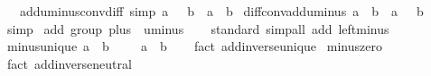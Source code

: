 \begin{isabellebody}
\ \ \ add{\isacharunderscore}{\kern0pt}uminus{\isacharunderscore}{\kern0pt}conv{\isacharunderscore}{\kern0pt}diff\ {\isacharbrackleft}{\kern0pt}simp{\isacharbrackright}{\kern0pt}{\isacharcolon}{\kern0pt}\ {\isachardoublequoteopen}a\ {\isacharplus}{\kern0pt}\ {\isacharparenleft}{\kern0pt}{\isacharminus}{\kern0pt}\ b{\isacharparenright}{\kern0pt}\ {\isacharequal}{\kern0pt}\ a\ {\isacharminus}{\kern0pt}\ b{\isachardoublequoteclose}\isanewline
{}\isanewline
\isanewline
{}\isamarkupfalse%
\ diff{\isacharunderscore}{\kern0pt}conv{\isacharunderscore}{\kern0pt}add{\isacharunderscore}{\kern0pt}uminus{\isacharcolon}{\kern0pt}\ {\isachardoublequoteopen}a\ {\isacharminus}{\kern0pt}\ b\ {\isacharequal}{\kern0pt}\ a\ {\isacharplus}{\kern0pt}\ {\isacharparenleft}{\kern0pt}{\isacharminus}{\kern0pt}\ b{\isacharparenright}{\kern0pt}{\isachardoublequoteclose}\isanewline
%
\isadelimproof
\ \ %
\endisadelimproof
%
\isatagproof
{}\isamarkupfalse%
\ simp%
\endisatagproof
{\isafoldproof}%
%
\isadelimproof
\isanewline
%
\endisadelimproof
\isanewline
{}\isamarkupfalse%
\ add{\isacharcolon}{\kern0pt}\ group\ plus\ {}\ uminus\isanewline
%
\isadelimproof
\ \ %
\endisadelimproof
%
\isatagproof
{}\isamarkupfalse%
\ standard\ {\isacharparenleft}{\kern0pt}simp{\isacharunderscore}{\kern0pt}all\ add{\isacharcolon}{\kern0pt}\ left{\isacharunderscore}{\kern0pt}minus{\isacharparenright}{\kern0pt}%
\endisatagproof
{\isafoldproof}%
%
\isadelimproof
\isanewline
%
\endisadelimproof
\isanewline
{}\isamarkupfalse%
\ minus{\isacharunderscore}{\kern0pt}unique{\isacharcolon}{\kern0pt}\ {\isachardoublequoteopen}a\ {\isacharplus}{\kern0pt}\ b\ {\isacharequal}{\kern0pt}\ {}\ {\isasymLongrightarrow}\ {\isacharminus}{\kern0pt}\ a\ {\isacharequal}{\kern0pt}\ b{\isachardoublequoteclose}\isanewline
%
\isadelimproof
\ \ %
\endisadelimproof
%
\isatagproof
{}\isamarkupfalse%
\ {\isacharparenleft}{\kern0pt}fact\ add{\isachardot}{\kern0pt}inverse{\isacharunderscore}{\kern0pt}unique{\isacharparenright}{\kern0pt}%
\endisatagproof
{\isafoldproof}%
%
\isadelimproof
\isanewline
%
\endisadelimproof
\isanewline
{}\isamarkupfalse%
\ minus{\isacharunderscore}{\kern0pt}zero{\isacharcolon}{\kern0pt}\ {\isachardoublequoteopen}{\isacharminus}{\kern0pt}\ {}\ {\isacharequal}{\kern0pt}\ {}{\isachardoublequoteclose}\isanewline
%
\isadelimproof
\ \ %
\endisadelimproof
%
\isatagproof
{}\isamarkupfalse%
\ {\isacharparenleft}{\kern0pt}fact\ add{\isachardot}{\kern0pt}inverse{\isacharunderscore}{\kern0pt}neutral{\isacharparenright}{\kern0pt}%

\end{isabellebody}
